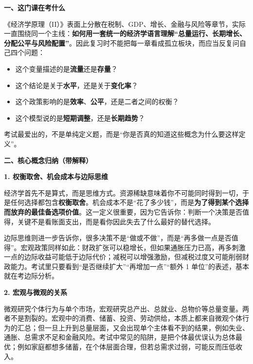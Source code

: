 ﻿

\textbf{一、这门课在考什么}

《经济学原理（II）》表面上分散在税制、GDP、增长、金融与风险等章节，实际一直围绕同一个主线：\textbf{如何用一套统一的经济学语言理解“总量运行、长期增长、分配公平与风险配置”}。因此复习时不能把每一章看成孤立板块，而应当反复问自己四个问题：

\begin{itemize}[leftmargin=2em,itemsep=0.25em,topsep=0.25em]
  \item 这个变量描述的是\textbf{流量}还是\textbf{存量}？
  \item 这个结论是关于\textbf{水平}，还是关于\textbf{变化率}？
  \item 这个政策影响的是\textbf{效率}、\textbf{公平}，还是二者之间的权衡？
  \item 这个模型说的是\textbf{短期调整}，还是\textbf{长期趋势}？
\end{itemize}

考试最爱出的，不是单纯定义题，而是“你是否真的知道这些概念为什么要这样定义”。

\textbf{二、核心概念归纳（带解释）}

\textbf{1. 权衡取舍、机会成本与边际思维}

经济学首先不是算式，而是思维方式。资源稀缺意味着你不可能同时得到一切，于是任何选择都包含\textbf{权衡取舍}。机会成本不是“花了多少钱”，而是\textbf{为了得到某个选择而放弃的最佳备选项价值}。这一定义很重要，因为它告诉你：判断一个决策是否值得，关键不是看账面支出，而是看你因此失去了什么最好的替代选择。

边际思维则进一步告诉你，很多决策不是“做或不做”，而是“再多做一点是否值得”。宏观政策同样如此：财政扩张可以稳增长，但如果通胀压力已高，再多刺激一点的边际收益可能低于边际代价；减税可以增强激励，但减税过度又可能削弱财政能力。考试里只要看到“是否继续扩大”“再增加一点”“额外 1 单位”的表述，基本就在考边际分析。

\textbf{2. 宏观与微观的关系}

微观研究个体行为与单个市场，宏观研究总产出、总就业、总物价等总量变量。两者不是割裂的。宏观中的消费、储蓄、投资、劳动供给，本质上都来自微观个体行为的汇总；但一旦上升到总量层面，又会出现单个主体看不到的结果，例如失业、通胀、总需求不足和金融风险。考试中常见的陷阱，是把个体最优误认为总体最优；例如家庭都想多储蓄，在个体层面合理，但若总需求过弱，可能反而压低收入。

